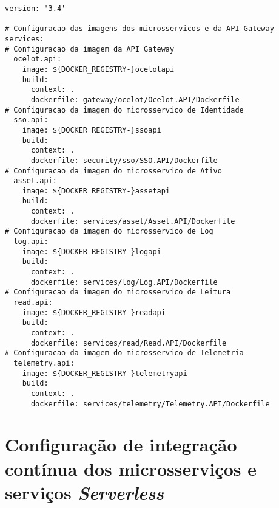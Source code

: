 \begin{lstlisting}[language=docker-compose-2, label=ci-docker-servicos]
version: '3.4'

# Configuracao das imagens dos microsservicos e da API Gateway
services:
# Configuracao da imagem da API Gateway
  ocelot.api:
    image: ${DOCKER_REGISTRY-}ocelotapi
    build:
      context: .
      dockerfile: gateway/ocelot/Ocelot.API/Dockerfile
# Configuracao da imagem do microsservico de Identidade
  sso.api:
    image: ${DOCKER_REGISTRY-}ssoapi
    build:
      context: .
      dockerfile: security/sso/SSO.API/Dockerfile
# Configuracao da imagem do microsservico de Ativo
  asset.api:
    image: ${DOCKER_REGISTRY-}assetapi
    build:
      context: .
      dockerfile: services/asset/Asset.API/Dockerfile
# Configuracao da imagem do microsservico de Log
  log.api:
    image: ${DOCKER_REGISTRY-}logapi
    build:
      context: .
      dockerfile: services/log/Log.API/Dockerfile
# Configuracao da imagem do microsservico de Leitura
  read.api:
    image: ${DOCKER_REGISTRY-}readapi
    build:
      context: .
      dockerfile: services/read/Read.API/Dockerfile
# Configuracao da imagem do microsservico de Telemetria
  telemetry.api:
    image: ${DOCKER_REGISTRY-}telemetryapi
    build:
      context: .
      dockerfile: services/telemetry/Telemetry.API/Dockerfile
\end{lstlisting}

\section{Configuração de integração contínua dos microsserviços e serviços \textit{Serverless}}

